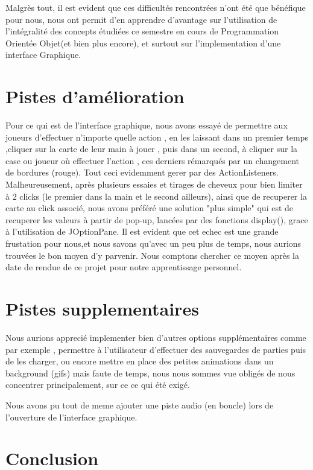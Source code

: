\documentclass[a4paper, 11pt, DIV=9]{scrartcl}
\begin{document}
Malgrès tout, il est evident que ces difficultés rencontrées n'ont été que bénéfique pour nous,
nous ont permit d'en apprendre d'avantage sur l'utilisation de l'intégralité des concepts étudiées ce semestre 
en cours de Programmation Orientée Objet(et bien plus encore), et surtout sur l'implementation d'une interface Graphique.


\section{Pistes d'amélioration}

Pour ce qui est de l'interface graphique, nous avons essayé de permettre aux joueurs d'effectuer n'importe quelle
action , en les laissant dans un premier temps ,cliquer sur la carte de leur main à jouer , puis dans un second,
à cliquer sur la case ou joueur où effectuer l'action , ces derniers rémarqués par un changement de bordures (rouge).
Tout ceci evidemment gerer par des ActionListeners.
Malheureusement, après plusieurs essaies et tirages de cheveux pour bien limiter à 2 clicks (le premier dans la main et le second ailleurs),
ainsi que de recuperer la carte au click associé, nous avons préféré une solution "plus simple" qui est de recuperer les valeurs à partir de pop-up, 
lancées par des fonctions display(), grace à l'utilisation de JOptionPane.
Il est evident que cet echec est une grande frustation pour nous,et nous savons qu'avec un peu plus de temps, nous aurions trouvées le bon moyen
d'y parvenir.
Nous comptons chercher ce moyen après la date de rendue de ce projet pour notre apprentissage personnel.


\section{Pistes supplementaires}
  Nous aurions apprecié implementer bien d'autres options supplémentaires comme par exemple ,
  permettre à l'utilisateur d'effectuer des sauvegardes de parties puis de les charger,
  ou encore mettre en place des petites animations dans un background (gifs)
  mais faute de temps, nous nous sommes vue obligés de nous concentrer principalement,
  sur ce ce qui été exigé.
 
  Nous avons pu tout de meme ajouter une piste audio (en boucle) lors de l'ouverture de l'interface graphique.
  
  
\section{Conclusion}
\end{document}
